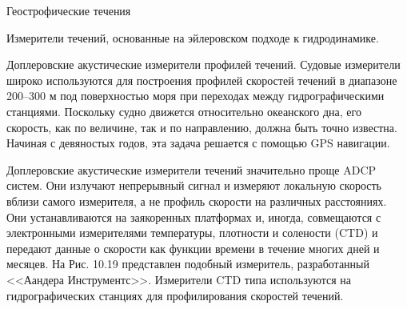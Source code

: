 \begin{chapter}{Геострофические течения}
\begin{section}{Измерители течений, основанные на эйлеровском подходе 
к гидродинамике.}
\begin{paragraph}{Доплеровские акустические измерители профилей течений.}
Судовые измерители широко используются для построения профилей
скоростей течений в диапазоне 200--300 м под поверхностью моря при
переходах между гидрографическими станциями. Поскольку судно движется
относительно океанского дна, его скорость, как по величине, так и по
направлению, должна быть точно известна. Начиная с девяностых годов,
эта задача решается с помощью GPS навигации.
%

Доплеровские акустические измерители течений значительно проще ADCP
систем. Они излучают непрерывный сигнал и измеряют локальную скорость
вблизи самого измерителя, а не профиль скорости на различных
расстояниях. Они устанавливаются на заякоренных платформах и, иногда,
совмещаются с электронными измерителями температуры, плотности и
солености (CTD) и передают данные о скорости как функции времени в
течение многих дней и месяцев. На Рис. 10.19 представлен подобный
измеритель, разработанный <<Аандера Инструментс>>. Измерители CTD типа
используются на гидрографических станциях для профилирования скоростей
течений.
%


\end{paragraph}
\end{section}
\end{chapter}
